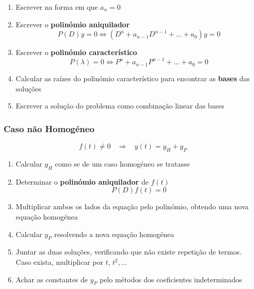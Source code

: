 \documentclass[11pt, a4paper]{article}
\begin{document}
\begin{enumerate}
    \item Escrever na forma em que $a_n = 0$
    \item Escrever o \textbf{polinómio aniquilador}
        \begin{equation*}
            P(D)y = 0 \Leftrightarrow
            \left(D^n + a_{n-1} D^{n-1} + \ldots + a_0\right) y = 0 
        \end{equation*}
    \item Escrever o \textbf{polinómio característico}
        \begin{equation*}
            P(\lambda) = 0 \Leftrightarrow 
            P^n + a_{n-1} P^{n-1} + \ldots + a_0 = 0
        \end{equation*}
    \item Calcular as raízes do polinómio característico para encontrar as 
    \textbf{bases} das soluções
    \item Escrever a solução do problema como combinação linear das bases
\end{enumerate}

\subsubsection{Caso não Homogéneo}

\begin{equation*}
    f(t) \ne 0 \ \ \ \ \Rightarrow \ \ \ \ y(t) = y_H + y_P
\end{equation*}

\begin{enumerate}
    \item Calcular $y_H$ como se de um caso homogéneo se tratasse
    \item Determinar o \textbf{polinómio aniquilador} de $f(t)$
    \begin{equation*}
        P(D)f(t) = 0
    \end{equation*}
    \item Multiplicar ambos os lados da equação pelo polinómio, obtendo uma nova
    equação homogénea
    \item Calcular $y_P$ resolvendo a nova equação homogénea
    \item Juntar as duas soluções, verificando que não existe repetição de termos. \\
    Caso exista, multiplicar por $t,\,t^2,\ldots$
    \item Achar as constantes de $y_P$ pelo métodos dos coeficientes indeterminados
\end{enumerate}
\end{document}

